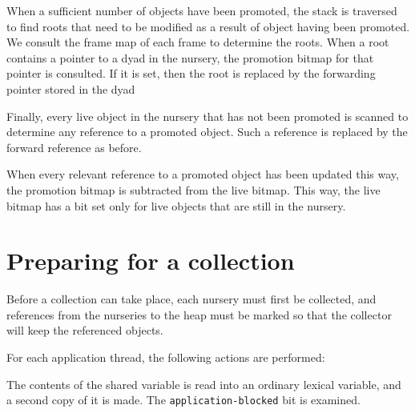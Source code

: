 When a sufficient number of objects have been promoted, the stack is
traversed to find roots that need to be modified as a result of object
having been promoted.  We consult the frame map of each frame to
determine the roots.  When a root contains a pointer to a dyad in the
nursery, the promotion bitmap for that pointer is consulted.  If it is
set, then the root is replaced by the forwarding pointer stored in the
dyad

Finally, every live object in the nursery that has not been promoted
is scanned to determine any reference to a promoted object.  Such a
reference is replaced by the forward reference as before.

When every relevant reference to a promoted object has been updated
this way, the promotion bitmap is subtracted from the live
bitmap.  This way, the live bitmap has a bit set only for live
objects that are still in the nursery.

\section{Preparing for a collection}

Before a collection can take place, each nursery must first be
collected, and references from the nurseries to the heap must
be marked so that the collector will keep the referenced
objects.

For each application thread, the following actions are performed:

The contents of the shared variable is read into an ordinary lexical
variable, and a second copy of it is made.  The
\texttt{application-blocked} bit is examined.

